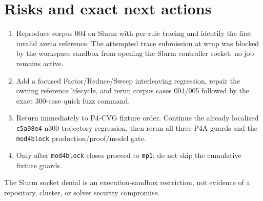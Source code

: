 \documentclass[11pt]{article}
\newcommand{\code}[1]{\nolinkurl{#1}}
\begin{document}
\section{Risks and exact next actions}

\begin{enumerate}[leftmargin=*]
  \item Reproduce corpus 004 on Slurm with per-rule tracing and identify the
        first invalid arena reference. The attempted trace submission at wrap
        was blocked by the workspace sandbox from opening the Slurm controller
        socket; no job remains active.
  \item Add a focused Factor/Reduce/Sweep interleaving regression, repair the
        owning reference lifecycle, and rerun corpus cases 004/005 followed by
        the exact 300-case quick fuzz command.
  \item Return immediately to P4-CVG fixture order. Continue the already
        localized \code{c5a98e4} n300 trajectory regression, then rerun all
        three P4A guards and the \code{mod4block} production/proof/model gate.
  \item Only after \code{mod4block} closes proceed to \code{mp1}; do not skip
        the cumulative fixture guards.
\end{enumerate}

The Slurm socket denial is an execution-sandbox restriction, not evidence of a
repository, cluster, or solver security compromise.
\end{document}
